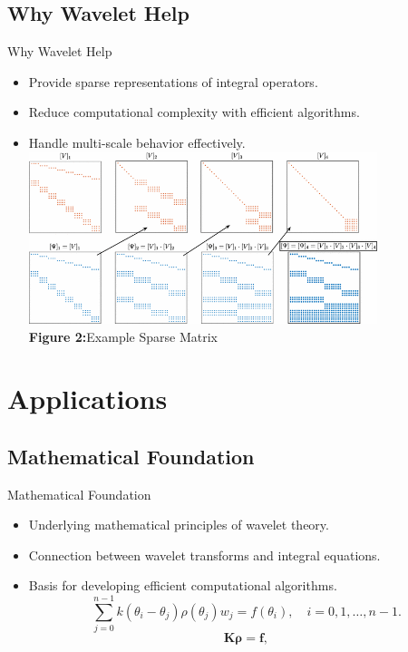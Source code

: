\documentclass{beamer}
\begin{document}
\subsection{Why Wavelet Help}
\begin{frame}{Why Wavelet Help}
    \begin{itemize}
        \item Provide sparse representations of integral operators.
        \item Reduce computational complexity with efficient algorithms.
        \item Handle multi-scale behavior effectively.
        \vfil
        \centering
        \includegraphics[width=0.8\textwidth]{Example_Sparse_Matrix.png} %
        \\[0.2cm] %
        {\small \textbf {Figure 2:}Example Sparse Matrix} %
    \end{itemize}
\end{frame}

\section{Applications}
\subsection{Mathematical Foundation}
\begin{frame}{Mathematical Foundation}
    \begin{itemize}
        \item Underlying mathematical principles of wavelet theory.
        \item Connection between wavelet transforms and integral equations.
        \item Basis for developing efficient computational algorithms.
        \[
              \sum_{j=0}^{n-1} k(\theta_i - \theta_j) \rho(\theta_j) w_j = f(\theta_i), \quad i = 0, 1, \dots, n-1.
        \]
        \[
                \mathbf{K} \boldsymbol{\rho} = \mathbf{f},
        \]
    \end{itemize}
\end{frame}
\end{document}
